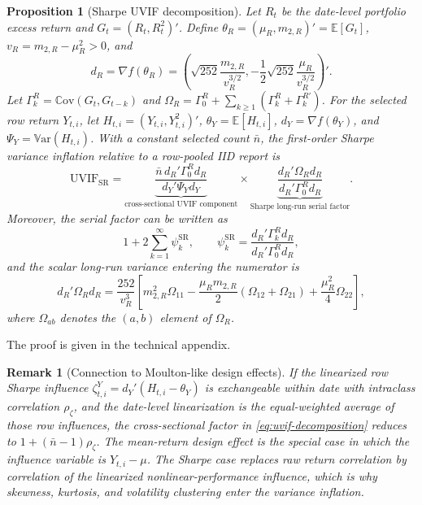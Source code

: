 \documentclass[12pt,a4paper]{article}
\newtheorem{proposition}{Proposition}
\newtheorem{remark}{Remark}
\newcommand{\E}{\mathbb{E}}
\newcommand{\Var}{\mathbb{V}\mathrm{ar}}
\newcommand{\Cov}{\mathbb{C}\mathrm{ov}}
\newcommand{\SR}{\mathrm{SR}}
\newcommand{\UVIF}{\mathrm{UVIF}}
\begin{document}
\begin{proposition}[Sharpe UVIF decomposition]
Let \(R_t\) be the date-level portfolio excess return and
\(G_t=(R_t,R_t^2)'\).  Define
\(\theta_R=(\mu_R,m_{2,R})'=\E[G_t]\),
\(v_R=m_{2,R}-\mu_R^2>0\), and
\[
  d_R=\nabla f(\theta_R)
  =
  \left(
  \sqrt{252}\frac{m_{2,R}}{v_R^{3/2}},
  -\frac{1}{2}\sqrt{252}\frac{\mu_R}{v_R^{3/2}}
  \right)' .
\]
Let \(\Gamma_k^R=\Cov(G_t,G_{t-k})\) and
\(\Omega_R=\Gamma_0^R+\sum_{k\ge1}(\Gamma_k^R+\Gamma_k^{R\prime})\).
For the selected row return \(Y_{t,i}\), let
\(H_{t,i}=(Y_{t,i},Y_{t,i}^2)'\),
\(\theta_Y=\E[H_{t,i}]\), \(d_Y=\nabla f(\theta_Y)\), and
\(\Psi_Y=\Var(H_{t,i})\).  With a constant selected count
\(\bar n\), the first-order Sharpe variance inflation relative to a
row-pooled IID report is
\begin{equation}
  \UVIF_{\SR}
  =
  \underbrace{
  \frac{\bar n\, d_R'\Gamma_0^R d_R}
       {d_Y'\Psi_Y d_Y}
  }_{\text{cross-sectional UVIF component}}
  \times
  \underbrace{
  \frac{d_R'\Omega_R d_R}
       {d_R'\Gamma_0^R d_R}
  }_{\text{Sharpe long-run serial factor}} .
  \label{eq:uvif-decomposition}
\end{equation}
Moreover, the serial factor can be written as
\[
  1+2\sum_{k=1}^{\infty}\psi_k^{\SR},
  \qquad
  \psi_k^{\SR}
  =
  \frac{d_R'\Gamma_k^R d_R}{d_R'\Gamma_0^R d_R},
\]
and the scalar long-run variance entering the numerator is
\begin{equation}
  d_R'\Omega_R d_R
  =
  \frac{252}{v_R^3}
  \left[
    m_{2,R}^2\Omega_{11}
    -\frac{\mu_R m_{2,R}}{2}(\Omega_{12}+\Omega_{21})
    +\frac{\mu_R^2}{4}\Omega_{22}
  \right],
  \label{eq:uvif-fourth-moment}
\end{equation}
where \(\Omega_{ab}\) denotes the \((a,b)\) element of \(\Omega_R\).
\end{proposition}

\noindent The proof is given in the technical appendix.

\begin{remark}[Connection to Moulton-like design effects]
If the linearized row Sharpe influence
\(\zeta_{t,i}^Y=d_Y'(H_{t,i}-\theta_Y)\) is exchangeable within date
with intraclass correlation \(\rho_\zeta\), and the date-level
linearization is the equal-weighted average of those row influences, the
cross-sectional factor in \eqref{eq:uvif-decomposition} reduces to
\(1+(\bar n-1)\rho_\zeta\).  The mean-return design effect is the
special case in which the influence variable is \(Y_{t,i}-\mu\).  The
Sharpe case replaces raw return correlation by correlation of the
linearized nonlinear-performance influence, which is why skewness,
kurtosis, and volatility clustering enter the variance inflation.
\end{remark}
\end{document}
